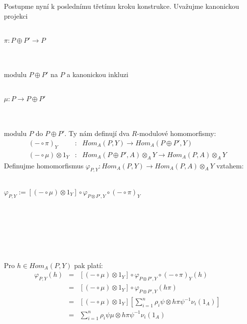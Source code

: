        Postupme nyní k poslednímu třetímu kroku konstrukce. Uvažujme kanonickou 
       projekci \\\\
       \centerline{$\pi : P\oplus P'\rightarrow P$} \\\\
       modulu $P\oplus P'$ na $P$ a kanonickou inkluzi \\\\
       \centerline{$\mu : P\rightarrow P\oplus P'$} \\\\
       modulu $P$ do $P\oplus P'$. Ty nám definují dva $R$-modulové 
       homomorfismy: 
       \begin{eqnarray}
         (-\circ\pi)_Y &:& Hom_A(P,Y)\rightarrow Hom_A(P\oplus P', Y) \nonumber \\
         (-\circ\mu)\otimes 1_Y &:& Hom_A(P\oplus P', A)\otimes_A Y \to Hom_A(P, A)\otimes_A Y \nonumber
       \end{eqnarray}
       Definujme homomorfismus $\varphi_{P,Y}:Hom_A(P,Y)\rightarrow Hom_A(P,A)\otimes_A Y$ vztahem: \\\\
       \centerline{$\varphi_{P,Y}:= [(-\circ\mu)\otimes 1_Y] \circ \varphi_{P\otimes P',Y} \circ (-\circ\pi)_Y$}      
       \\\\  
         \centerline{}\\\\\\
       Pro $h\in Hom_A(P,Y)$ pak platí:
       \begin{eqnarray}
         \varphi_{P,Y}(h) &=& [(-\circ\mu)\otimes 1_Y] \circ \varphi_{P\otimes P',Y} \circ (-\circ\pi)_Y (h)  \nonumber \\
         &=& [(-\circ\mu)\otimes 1_Y]\circ\varphi_{P\otimes P',Y} (h\pi)  \nonumber \\
         &=& [(-\circ\mu)\otimes 1_Y][\sum_{i=1}^n\rho_i\psi\otimes h\pi\psi^{-1}\nu_i(1_A)]  \nonumber \\
         &=& \sum_{i=1}^n\rho_i\psi\mu\otimes h\pi\psi^{-1}\nu_i(1_A) \nonumber
       \end{eqnarray}


